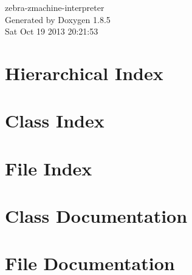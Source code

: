 \documentclass[twoside]{book}
\newcommand{\clearemptydoublepage}{%
  \newpage{\pagestyle{empty}\cleardoublepage}%
}
\begin{document}
\hypersetup{pageanchor=false}
\begin{titlepage}
\vspace*{7cm}
\begin{center}%
{\Large zebra-\/zmachine-\/interpreter }\\
\vspace*{1cm}
{\large Generated by Doxygen 1.8.5}\\
\vspace*{0.5cm}
{\small Sat Oct 19 2013 20:21:53}\\
\end{center}
\end{titlepage}
\clearemptydoublepage
\tableofcontents
\clearemptydoublepage
{}
\hypersetup{pageanchor=true}

\chapter{Hierarchical Index}

\chapter{Class Index}

\chapter{File Index}

\chapter{Class Documentation}

















\chapter{File Documentation}




















\newpage
{}
{}
\printindex
\end{document}
